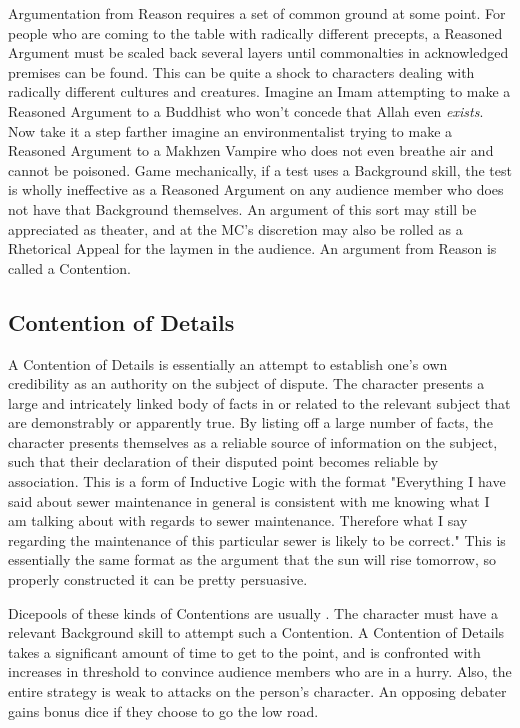 Argumentation from Reason requires a set of common ground at some point. For people who are coming to the table with radically different precepts, a Reasoned Argument must be scaled back several layers until commonalties in acknowledged premises can be found. This can be quite a shock to characters dealing with radically different cultures and creatures. Imagine an Imam attempting to make a Reasoned Argument to a Buddhist who won't concede that Allah even \textit{exists}. Now take it a step farther imagine an environmentalist trying to make a Reasoned Argument to a Makhzen Vampire who does not even breathe air and cannot be poisoned. Game mechanically, if a test uses a Background skill, the test is wholly ineffective as a Reasoned Argument on any audience member who does not have that Background themselves. An argument of this sort may still be appreciated as theater, and at the MC's discretion may also be rolled as a Rhetorical Appeal for the laymen in the audience. An argument from Reason is called a Contention.

\subsection{Contention of Details}

A Contention of Details is essentially an attempt to establish one's own credibility as an authority on the subject of dispute. The character presents a large and intricately linked body of facts in or related to the relevant subject that are demonstrably or apparently true. By listing off a large number of facts, the character presents themselves as a reliable source of information on the subject, such that their declaration of their disputed point becomes reliable by association. This is a form of Inductive Logic with the format "Everything I have said about sewer maintenance in general is consistent with me knowing what I am talking about with regards to sewer maintenance. Therefore what I say regarding the maintenance of this particular sewer is likely to be correct." This is essentially the same format as the argument that the sun will rise tomorrow, so properly constructed it can be pretty persuasive.

Dicepools of these kinds of Contentions are usually . The character must have a relevant Background skill to attempt such a Contention. A Contention of Details takes a significant amount of time to get to the point, and is confronted with increases in threshold to convince audience members who are in a hurry. Also, the entire strategy is weak to attacks on the person's character. An opposing debater gains bonus dice if they choose to go the low road.

